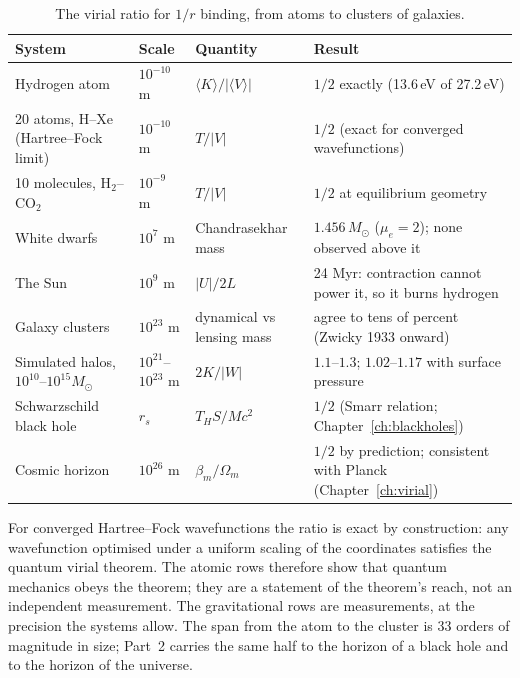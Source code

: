 \begin{table}[h]\centering\small
\caption{The virial ratio for $1/r$ binding, from atoms to clusters of galaxies.}\label{tab:virial_domains}
\begin{tabular}{llll}
\hline
System & Scale & Quantity & Result\\\hline
Hydrogen atom & $10^{-10}$ m & $\langle K\rangle/|\langle V\rangle|$ & $1/2$ exactly (13.6\,eV of 27.2\,eV)\\
20 atoms, H--Xe (Hartree--Fock limit) & $10^{-10}$ m & $T/|V|$ & $1/2$ (exact for converged wavefunctions)\\
10 molecules, H$_2$--CO$_2$ & $10^{-9}$ m & $T/|V|$ & $1/2$ at equilibrium geometry\\
White dwarfs & $10^{7}$ m & Chandrasekhar mass & $1.456\,M_\odot$ ($\mu_e=2$); none observed above it\\
The Sun & $10^{9}$ m & $|U|/2L$ & 24 Myr: contraction cannot power it, so it burns hydrogen\\
Galaxy clusters & $10^{23}$ m & dynamical vs lensing mass & agree to tens of percent (Zwicky 1933 onward)\\
Simulated halos, $10^{10}$--$10^{15}M_\odot$ & $10^{21}$--$10^{23}$ m & $2K/|W|$ & $1.1$--$1.3$; $1.02$--$1.17$ with surface pressure\\
Schwarzschild black hole & $r_s$ & $T_HS/Mc^2$ & $1/2$ (Smarr relation; Chapter~\ref{ch:blackholes})\\
Cosmic horizon & $10^{26}$ m & $\beta_m/\Omega_m$ & $1/2$ by prediction; consistent with Planck (Chapter~\ref{ch:virial})\\\hline
\end{tabular}
\end{table}

For converged Hartree--Fock wavefunctions the ratio is exact by construction: any wavefunction optimised under a uniform scaling of the coordinates satisfies
the quantum virial theorem. The atomic rows therefore show that quantum mechanics obeys the theorem; they are a statement of the theorem's reach, not an
independent measurement. The gravitational rows are measurements, at the precision the systems allow. The span from the atom to the cluster is 33 orders of
magnitude in size; Part~2 carries the same half to the horizon of a black hole and to the horizon of the universe.

